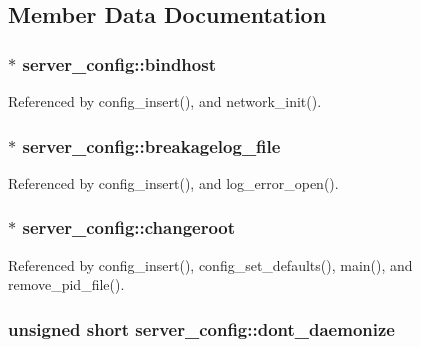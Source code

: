\subsection{Member Data Documentation}
\hypertarget{structserver__config_ad0f33959056b9d6aaf99e4a5b7665f02}{
\subsubsection[{bindhost}]{$\ast$ server\-\_\-config\-::bindhost}}\label{structserver__config_ad0f33959056b9d6aaf99e4a5b7665f02}


Referenced by config\-\_\-insert(), and network\-\_\-init().

\hypertarget{structserver__config_af7869cc9b438a05394b1338e489f3f6c}{
\subsubsection[{breakagelog\-\_\-file}]{$\ast$ server\-\_\-config\-::breakagelog\-\_\-file}}\label{structserver__config_af7869cc9b438a05394b1338e489f3f6c}


Referenced by config\-\_\-insert(), and log\-\_\-error\-\_\-open().

\hypertarget{structserver__config_ae0022338b6e503d9e0530d9cb0fd9f52}{
\subsubsection[{changeroot}]{$\ast$ server\-\_\-config\-::changeroot}}\label{structserver__config_ae0022338b6e503d9e0530d9cb0fd9f52}


Referenced by config\-\_\-insert(), config\-\_\-set\-\_\-defaults(), main(), and remove\-\_\-pid\-\_\-file().

\hypertarget{structserver__config_a2a95b6b73b4f971a0cfe7cd92673f668}{
\subsubsection[{dont\-\_\-daemonize}]{\setlength{\rightskip}{0pt plus 5cm}unsigned short server\-\_\-config\-::dont\-\_\-daemonize}}\label{structserver__config_a2a95b6b73b4f971a0cfe7cd92673f668}


